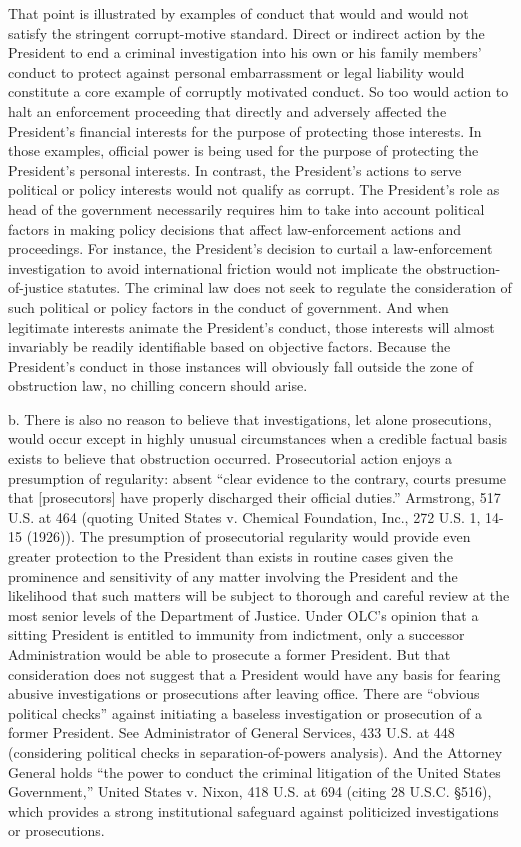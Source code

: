 That point is illustrated by examples of conduct that would and would not satisfy the stringent corrupt-motive standard.
Direct or indirect action by the President to end a criminal investigation into his own or his family members’ conduct to protect against personal embarrassment or legal liability would constitute a core example of corruptly motivated conduct.
So too would action to halt an enforcement proceeding that directly and adversely affected the President’s financial interests for the purpose of protecting those interests.
In those examples, official power is being used for the purpose of protecting the President’s personal interests.
In contrast, the President’s actions to serve political or policy interests would not qualify as corrupt.
The President’s role as head of the government necessarily requires him to take into account political factors in making policy decisions that affect law-enforcement actions and proceedings.
For instance, the President’s decision to curtail a law-enforcement investigation to avoid international friction would not implicate the obstruction-of-justice statutes.
The criminal law does not seek to regulate the consideration of such political or policy factors in the conduct of government.
And when legitimate interests animate the President’s conduct, those interests will almost invariably be readily identifiable based on objective factors.
Because the President’s conduct in those instances will obviously fall outside the zone of obstruction law, no chilling concern should arise.

b. There is also no reason to believe that investigations, let alone prosecutions, would occur except in highly unusual circumstances when a credible factual basis exists to believe that obstruction occurred.
Prosecutorial action enjoys a presumption of regularity: absent “clear evidence to the contrary, courts presume that [prosecutors] have properly discharged their official duties.” Armstrong, 517 U.S. at 464 (quoting United States v. Chemical Foundation, Inc., 272 U.S. 1, 14-15 (1926)).
The presumption of prosecutorial regularity would provide even greater protection to the President than exists in routine cases given the prominence and sensitivity of any matter involving the President and the likelihood that such matters will be subject to thorough and careful review at the most senior levels of the Department of Justice.
Under OLC’s opinion that a sitting President is entitled to immunity from indictment, only a successor Administration would be able to prosecute a former President.
But that consideration does not suggest that a President would have any basis for fearing abusive investigations or prosecutions after leaving office.
There are “obvious political checks” against initiating a baseless investigation or prosecution of a former President.
See Administrator of General Services, 433 U.S. at 448 (considering political checks in separation-of-powers analysis).
And the Attorney General holds “the power to conduct the criminal litigation of the United States Government,” United States v. Nixon, 418 U.S. at 694 (citing 28 U.S.C. \S 516), which provides a strong institutional safeguard against politicized investigations or prosecutions.%

